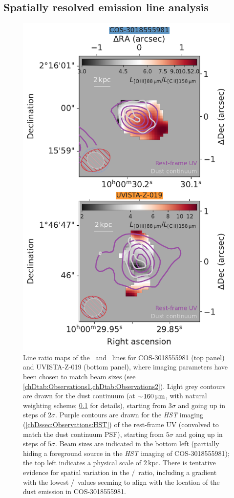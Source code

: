 \subsection{Spatially resolved emission line analysis}
\label{chDssec:Discussion:OIII/CII_spatially_resolved_analysis}
\begin{figure}
    \centering
    \includegraphics[width=0.6\linewidth]{"Plots/ChapterD/Line_ratio_maps_clean_cube_COS-3018555981_UVISTA-Z-019"}
    \caption[Line ratio map of the \OIIILam\ and \CIILam\ lines for COS-3018555981 and UVISTA-Z-019.]{Line ratio maps of the \OIIILam\ and \CIILam\ lines for COS-3018555981 (top panel) and UVISTA-Z-019 (bottom panel), where imaging parameters have been chosen to match beam sizes (see \cref{chDtab:Observations1,chDtab:Observations2}). Light grey contours are drawn for the dust continuum (at $\sim \! 160 \, \mathrm{\upmu m}$, with natural weighting scheme; \cref{chDssec:Discussion:OIII/CII_spatially_resolved_analysis} for details), starting from $3 \sigma$ and going up in steps of $2 \sigma$. Purple contours are drawn for the \textit{HST} imaging (\cref{chDssec:Observations:HST}) of the rest-frame UV (convolved to match the dust continuum PSF), starting from $5 \sigma$ and going up in steps of $5 \sigma$. Beam sizes are indicated in the bottom left (partially hiding a foreground source in the \textit{HST} imaging of COS-3018555981); the top left indicates a physical scale of $2 \, \mathrm{kpc}$. There is tentative evidence for spatial variation in the \OIIIf/\CII\ ratio, including a gradient with the lowest \OIIIf/\CII\ values seeming to align with the location of the dust emission in COS-3018555981.
    }
    \label{chDfig:OIII/CII_ratio_maps_of_COS-3018555981_and_UVISTA-Z-019}
\end{figure}

